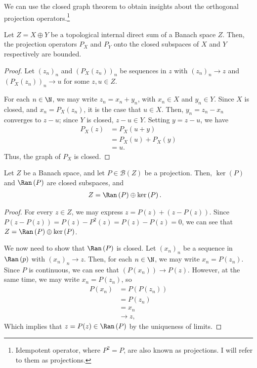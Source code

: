 \documentclass[10pt]{mypackage}
\begin{document}
  We can use the closed graph theorem to obtain insights about the orthogonal projection operators.\footnote{Idempotent operator, where $P^2 = P$, are also known as projections. I will refer to them as projections.}
  \begin{proposition}
    Let $Z = X\oplus Y$ be a topological internal direct sum of a Banach space $Z$. Then, the projection operators $P_{X}$ and $P_{Y}$ onto the closed subspaces of $X$ and $Y$ respectively are bounded.
  \end{proposition}
  \begin{proof}
    Let $\left(z_n\right)_n$ and $\left(P_X\left(z_n\right)\right)_n$ be sequences in $z$ with $\left(z_n\right)_n \rightarrow z$ and $\left(P_{X}\left(z_n\right)\right)_n \rightarrow u$ for some $z,u\in Z$.\newline

     For each $n\in \N$, we may write $z_n = x_n + y_n$, with $x_n\in X$ and $y_n \in Y$. Since $X$ is closed, and $x_n = P_X\left(z_n\right)$, it is the case that $u\in X$. Then, $y_n = z_n - x_n$ converges to $z - u$; since $Y$ is closed, $z-u\in Y$. Setting $y = z-u$, we have
     \begin{align*}
       P_X\left(z\right) &= P_X\left(u + y\right)\\
                         &= P_X\left(u\right) + P_X\left(y\right)\\
                        &= u.
     \end{align*}
     Thus, the graph of $P_X$ is closed.
  \end{proof}
  \begin{proposition}
    Let $Z$ be a Banach space, and let $P\in \mathcal{B}\left(Z\right)$ be a projection. Then, $\ker\left(P\right)$ and $\Ran\left(P\right)$ are closed subspaces, and
    \begin{align*}
      Z &= \Ran\left(P\right) \oplus \ker\left(P\right).
    \end{align*}
  \end{proposition}
  \begin{proof}
    For every $z\in Z$, we may express $z = P(z) + \left(z - P(z)\right)$. Since $P\left(z-P(z)\right) = P(z) - P^2\left(z\right) = P(z)-P(z) = 0$, we can see that $Z = \Ran\left(P\right) \oplus \ker\left(P\right)$.\newline

    We now need to show that $\Ran\left(P\right)$ is closed. Let $\left(x_n\right)_n$ be a sequence in $\Ran\left(p\right)$ with $\left(x_n\right)_n\rightarrow z$. Then, for each $n\in \N$, we may write $x_n = P\left(z_n\right)$. Since $P$ is continuous, we can see that $\left(P\left(x_n\right)\right)\rightarrow P\left(z\right)$. However, at the same time, we may write $x_n = P\left(z_n\right)$, so
    \begin{align*}
      P\left(x_n\right) &= P\left(P\left(z_n\right)\right)\\
                        &= P\left(z_n\right)\\
                        &= x_n\\
                        &\rightarrow z,
    \end{align*}
    Which implies that $z = P(z)\in \Ran\left(P\right)$ by the uniqueness of limits.
  \end{proof}
\end{document}
